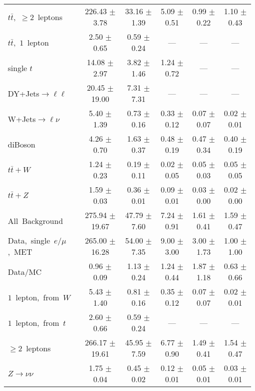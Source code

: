 \documentclass{article}
\begin{document}
\begin{longtable}{|l|c|c|c|c|c|}
$t\bar{t}$,~$\ge2$~leptons & 226.43 $\pm$ 3.78  & 33.16 $\pm$ 1.39  & 5.09 $\pm$ 0.51  & 0.99 $\pm$ 0.22  & 1.10 $\pm$ 0.43 \\* 
$t\bar{t}$,~$1$~lepton & 2.50 $\pm$ 0.65  & 0.59 $\pm$ 0.24  & ---  & ---  & --- \\* 
single $t$  & 14.08 $\pm$ 2.97  & 3.82 $\pm$ 1.46  & 1.24 $\pm$ 0.72  & ---  & --- \\* 
DY+Jets$\rightarrow\ell\ell$  & 20.45 $\pm$ 19.00  & 7.31 $\pm$ 7.31  & ---  & ---  & --- \\* 
W+Jets$\rightarrow\ell\nu$  & 5.40 $\pm$ 1.39  & 0.73 $\pm$ 0.16  & 0.33 $\pm$ 0.12  & 0.07 $\pm$ 0.07  & 0.02 $\pm$ 0.01 \\* 
diBoson  & 4.26 $\pm$ 0.70  & 1.63 $\pm$ 0.37  & 0.48 $\pm$ 0.19  & 0.47 $\pm$ 0.34  & 0.40 $\pm$ 0.19 \\* 
$t\bar{t}+W$  & 1.24 $\pm$ 0.23  & 0.19 $\pm$ 0.11  & 0.02 $\pm$ 0.05  & 0.05 $\pm$ 0.03  & 0.05 $\pm$ 0.05 \\* 
$t\bar{t}+Z$  & 1.59 $\pm$ 0.03  & 0.36 $\pm$ 0.01  & 0.09 $\pm$ 0.01  & 0.03 $\pm$ 0.00  & 0.02 $\pm$ 0.00 \\* 
\hline \hline 
All~Background  & 275.94 $\pm$ 19.67  & 47.79 $\pm$ 7.60  & 7.24 $\pm$ 0.91  & 1.61 $\pm$ 0.41  & 1.59 $\pm$ 0.47 \\* 
Data,~single~$e/\mu$,~MET  & 265.00 $\pm$ 16.28  & 54.00 $\pm$ 7.35  & 9.00 $\pm$ 3.00  & 3.00 $\pm$ 1.73  & 1.00 $\pm$ 1.00 \\* 
Data/MC  & 0.96 $\pm$ 0.09  & 1.13 $\pm$ 0.24  & 1.24 $\pm$ 0.44  & 1.87 $\pm$ 1.18  & 0.63 $\pm$ 0.66 \\* 
\hline \hline 
$1$~lepton,~from~$W$  & 5.43 $\pm$ 1.40  & 0.81 $\pm$ 0.16  & 0.35 $\pm$ 0.12  & 0.07 $\pm$ 0.07  & 0.02 $\pm$ 0.01 \\* 
$1$~lepton,~from~$t$  & 2.60 $\pm$ 0.66  & 0.59 $\pm$ 0.24  & ---  & ---  & --- \\* 
$\ge2$~leptons  & 266.17 $\pm$ 19.61  & 45.95 $\pm$ 7.59  & 6.77 $\pm$ 0.90  & 1.49 $\pm$ 0.41  & 1.54 $\pm$ 0.47 \\* 
$Z\rightarrow\nu\nu$  & 1.75 $\pm$ 0.04  & 0.45 $\pm$ 0.02  & 0.12 $\pm$ 0.01  & 0.05 $\pm$ 0.01  & 0.03 $\pm$ 0.01 \\* 
\hline 
\end{longtable} 

 
 
 
 
\pagebreak 

 
 
 
 
\end{document}
